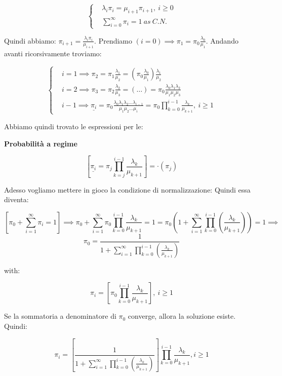 \[
	\left\{
	\begin{aligned}
	&\lambda_i\pi_i = \mu_{i+1}\pi_{i+1},\ i\geq 0\\
	&\sum_{i=0}^\infty{\pi_i} = 1\ as\ C.N.
	\end{aligned}
	\right.
\]

Quindi abbiamo: $\pi_{i+1} = \frac{\lambda_i \pi_i}{\mu_{i+1}}$. Prendiamo $(i=0) \implies \pi_1 = \pi_0 \frac{\lambda_0}{\mu_1}$. Andando avanti ricorsivamente troviamo:

\[
	\left\{ 
	\begin{aligned}
	&i=1 \implies \pi_2 = \pi_1 \frac{\lambda_1}{\mu_2} = (\pi_0 \frac{\lambda_0}{\mu_1})\frac{\lambda_1}{\mu_2}\\
&i=2 \implies \pi_3 = \pi_2 \frac{\lambda_2}{\mu_3} = (\dots) = \pi_0 \frac{\lambda_0\lambda_1\lambda_2}{\mu_1\mu_2\mu_3}\\
&i-1 \implies \underline{\pi_i} = \pi_0 \frac{\lambda_0\lambda_1\lambda_2\dots\lambda_{i-1}}{\mu_1\mu_2\dots\mu_i} = \pi_0\prod_{k=0}^{i-1}{\frac{\lambda_k}{\mu_{k+1}}},\ i \geq 1
	\end{aligned}
	\right.
\]

Abbiamo quindi trovato le espressioni per le:

\begin{defn}{\textbf{Probabilità a regime}}

\[
	[\underline{\pi_i} = \pi_j\prod_{k=j}^{i-1}{\frac{\lambda_k}{\mu_{k+1}}}] = \mathord{\cdot}(\pi_j)
\]
\end{defn}

Adesso vogliamo mettere in gioco la condizione di normalizzazione: Quindi essa diventa:

\[
	[\pi_0 + \sum_{i=1}^{\infty}{\pi_i} = 1] \implies \pi_0 + \sum_{i=1}^{\infty}{\pi_0\prod_{k=0}^{i-1}{\frac{\lambda_k}{\mu_{k+1}}}} = 1 = \pi_0(1 + \sum_{i=1}^{\infty}{\prod_{k=0}^{i-1}{(\frac{\lambda_k}{\mu_{k+1}})}}) = 1 \implies
\]
\[
	\pi_0 = \frac{1}{1 + \sum_{i=1}^{\infty}{\prod_{k=0}^{i-1}{(\frac{\lambda_k}{\mu_{k+1}})}}}
\]

with:

\[
	\pi_i = [\pi_0 \prod_{k=0}^{i-1}{\frac{\lambda_k}{\mu_{k+1}}}],\ i \geq 1
\]

\begin{corl}

Se la sommatoria a denominatore di $\pi_0$ converge, allora la soluzione esiste. Quindi:

\[
	\pi_i = [\frac{1}{1 + \sum_{i=1}^{\infty}{\prod_{k=0}^{i-1}{(\frac{\lambda_k}{\mu_{k+1}})}}}] \prod_{k=0}^{i-1}{\frac{\lambda_k}{\mu_{k+1}}},	 i \geq 1
\]
\end{corl}

